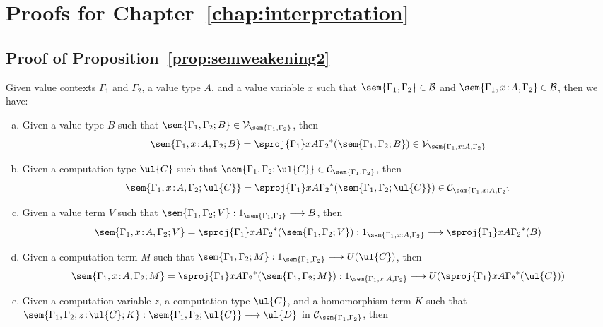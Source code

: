 
\chapter{Proofs for Chapter~\ref{chap:interpretation}}
\label{chap:appendixC5}

\section{Proof of Proposition~\ref{prop:semweakening2}}
\label{sect:proofofprop:semweakening2}

{
\renewcommand{\thetheorem}{\ref{prop:semweakening2}}
\begin{proposition}
Given value contexts $\Gamma_1$ and $\Gamma_2$, a value type $A$, and a value variable $x$ such that $\sem{\Gamma_1,\Gamma_2} \in \mathcal{B}$ and $\sem{\Gamma_1, x \!:\! A, \Gamma_2} \in \mathcal{B}$, then we have: 
\begin{enumerate}[(a)]
\item Given a value type $B$ such that $\sem{\Gamma_1,\Gamma_2;B} \in \mathcal{V}_{\sem{\Gamma_1,\Gamma_2}}$, then 
\[
\sem{\Gamma_1, x \!:\! A,\Gamma_2;B} = \sproj {\Gamma_1} x A {\Gamma_2}^*(\sem{\Gamma_1,\Gamma_2;B}) \in \mathcal{V}_{\sem{\Gamma_1, x : A,\Gamma_2}}
\]
\item Given a computation type $\ul{C}$ such that $\sem{\Gamma_1,\Gamma_2;\ul{C}} \in \mathcal{C}_{\sem{\Gamma_1,\Gamma_2}}$, then
\[
\sem{\Gamma_1, x \!:\! A,\Gamma_2;\ul{C}} = \sproj {\Gamma_1} x A {\Gamma_2}^*(\sem{\Gamma_1,\Gamma_2;\ul{C}}) \in \mathcal{C}_{\sem{\Gamma_1, x : A,\Gamma_2}}
\]
\item Given a value term $V$ such that $\sem{\Gamma_1,\Gamma_2;V} : 1_{\sem{\Gamma_1,\Gamma_2}} \longrightarrow B$, then
\[
\sem{\Gamma_1, x \!:\! A,\Gamma_2;V} = \sproj {\Gamma_1} x A {\Gamma_2}^*(\sem{\Gamma_1,\Gamma_2;V}) : 1_{\sem{\Gamma_1, x : A,\Gamma_2}} \longrightarrow \sproj {\Gamma_1} x A {\Gamma_2}^*(B)
\]
\item Given a computation term $M$ such that $\sem{\Gamma_1,\Gamma_2;M} : 1_{\sem{\Gamma_1,\Gamma_2}} \longrightarrow U(\ul{C})$, then 
\[
\sem{\Gamma_1, x \!:\! A,\Gamma_2;M} = \sproj {\Gamma_1} x A {\Gamma_2}^*(\sem{\Gamma_1,\Gamma_2;M}) : 1_{\sem{\Gamma_1, x : A,\Gamma_2}} \longrightarrow U(\sproj {\Gamma_1} x A {\Gamma_2}^*(\ul{C}))
\]
\item Given a computation variable $z$, a computation type $\ul{C}$, and a homomorphism term $K$ such that $\sem{\Gamma_1, \Gamma_2; z \!:\! \ul{C}; K} : \sem{\Gamma_1,\Gamma_2;\ul{C}} \longrightarrow \ul{D}$ in $\mathcal{C}_{\sem{\Gamma_1,\Gamma_2}}$, then


\end{enumerate}
\end{proposition}}
